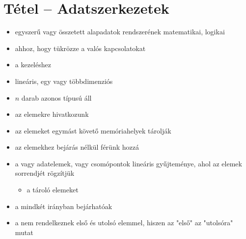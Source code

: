 \documentclass[main.tex]{subfiles}
\begin{document}
  \section{Tétel – Adatszerkezetek} %
  \begin{itemize}
    \item egyszerű vagy összetett alapadatok
    rendszerének matematikai, logikai 

    \item {} ahhoz, hogy tükrözze a valós kapcsolatokat
    
    \item {} a kezeléshez
  \end{itemize}

  \begin{itemize}
    \item lineáris, egy vagy többdimenziós
    
    \item $n$ darab azonos típusú  áll
    
    \item az elemekre  hivatkozunk
    
    \item az elemeket egymást követő memóriahelyek tárolják

    \item az elemekhez bejárás nélkül férünk hozzá
  \end{itemize}

  \begin{itemize}
    \item a  vagy 
    adatelemek, vagy csomópontok lineáris gyűjteménye,
    ahol az elemek sorrendjét rögzítjük
    \begin{itemize}
      \item a  tároló elemeket
    \end{itemize}

    \item a  mindkét irányban bejárhatóak
    
    \item a  nem rendelkeznek
    első és utolsó elemmel, hiszen az "első" az "utolsóra" mutat
  \end{itemize}
\end{document}
